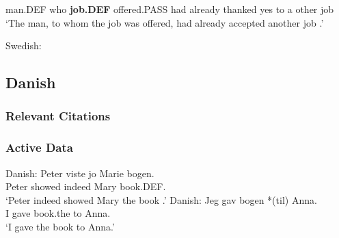 \begin{exe}
\begin{xlist}
{			man.DEF who \textbf{job.DEF} offered.PASS had already thanked yes to a other job\\
			\trans `The man, to whom the job was offered, had already accepted another job \citep[ex. 52]{Lundquist.2004}.'}
		\end{xlist}
	 Swedish:
		\begin{xlist}
		\end{xlist}
\end{exe}



\subsection{Danish}
\subsubsection{Relevant Citations}
\cite{Haugen.1982,Herslund.1986,Vikner.1989,Falk.1990,Sprouse.1995,Allan.1995,Bardal.2007,Lundquist.2013,Lundquist.2013b}
\subsubsection{Active Data}
\begin{exe}
	 Danish:
		\gll Peter viste jo Marie bogen.\\
		Peter showed indeed Mary book.DEF.\\
		\trans `Peter indeed showed Mary the book \citep{Vikner.1989}.'
	 Danish:
		\gll Jeg gav bogen *(til) Anna.\\
		I gave book.the to Anna.\\
		\trans `I gave the book to Anna\citep{Holmberg.1998}.'
\end{exe}
